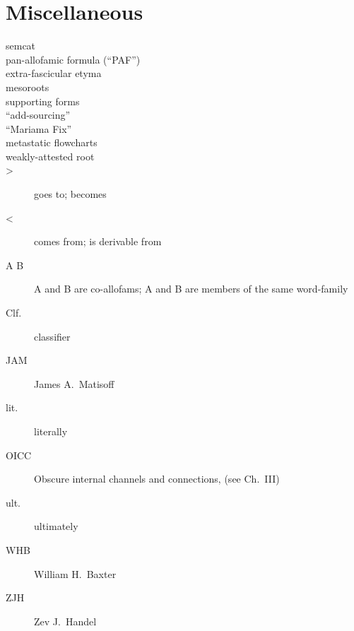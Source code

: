 \section*{Miscellaneous}
\begin{multicols}{2}
\begin{description}
\item[semcat]
\item[pan-allofamic formula (“PAF”)]
\item[extra-fascicular etyma]
\item[mesoroots]
\item[supporting forms]
\item[“add-sourcing”]
\item[“Mariama Fix”]
\item[metastatic flowcharts]
\item[weakly-attested root]
\item[>]	goes to; becomes
\item[<]	comes from; is derivable from
\item[A  B]		A and B are co-allofams; A and B are members of the same word-family
\item[Clf.]	classifier
\item[JAM]	James A.\ Matisoff
\item[lit.]	literally
\item[OICC]	Obscure internal channels and connections‚ (see Ch.~III)
\item[ult.]	ultimately
\item[WHB]	William H.\ Baxter
\item[ZJH]	Zev J.\ Handel
\end{description}
\end{multicols}

